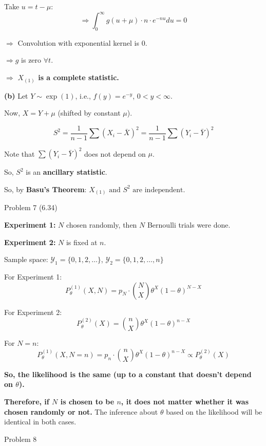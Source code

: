 \documentclass[12pt,a4paper,onecolumn]{exam}
\newcommand{\questionheader}[1]{%
  \begin{tcolorbox}[
    enhanced,
    colback=black,
    coltext=white,
    boxrule=0pt,
    fontupper=\Large\bfseries,
    arc=4mm
  ]
  #1
  \end{tcolorbox}%
}
\begin{document}
\begin{solution}
Take $u = t - \mu$:
\[
\Rightarrow \int_{0}^{\infty} g(u + \mu) \cdot n \cdot e^{-nu} du = 0
\]

$\Rightarrow$ Convolution with exponential kernel is 0.

$\Rightarrow g$ is zero $\forall t$.

$\Rightarrow$ \textbf{$X_{(1)}$ is a complete statistic.}

\vspace{1em}
\textbf{(b)} Let $Y \sim \exp(1)$, i.e., $f(y) = e^{-y}$, $0 < y < \infty$.

Now, $X = Y + \mu$ (shifted by constant $\mu$).

\[
S^2 = \frac{1}{n-1} \sum (X_i - \bar{X})^2 = \frac{1}{n-1} \sum (Y_i - \bar{Y})^2
\]

Note that $\sum (Y_i - \bar{Y})^2$ does not depend on $\mu$.

So, $S^2$ is an \textbf{ancillary statistic}.

So, by \textbf{Basu's Theorem}: $\boxed{X_{(1)} \text{ and } S^2 \text{ are independent}}$.
\end{solution}

\questionheader{Problem 7 (6.34)}

\begin{solution}
\textbf{Experiment 1:} $N$ chosen randomly, then $N$ Bernoulli trials were done.

\textbf{Experiment 2:} $N$ is fixed at $n$.

Sample space: $\mathcal{Y}_1 = \{0, 1, 2, \ldots\}$, $\mathcal{Y}_2 = \{0, 1, 2, \ldots, n\}$

\vspace{0.5em}
For Experiment 1:
\[
P_{\theta}^{(1)}(X, N) = p_N \cdot \binom{N}{X} \theta^X (1-\theta)^{N-X}
\]

For Experiment 2:
\[
P_{\theta}^{(2)}(X) = \binom{n}{X} \theta^X (1-\theta)^{n-X}
\]

For $N = n$:
\[
P_{\theta}^{(1)}(X, N = n) = p_n \cdot \binom{n}{X} \theta^X (1-\theta)^{n-X} \propto P_{\theta}^{(2)}(X)
\]

\textbf{So, the likelihood is the same (up to a constant that doesn't depend on $\theta$).}

\textbf{Therefore, if $N$ is chosen to be $n$, it does not matter whether it was chosen randomly or not.} The inference about $\theta$ based on the likelihood will be identical in both cases.
\end{solution}

\questionheader{Problem 8}
\end{document}

